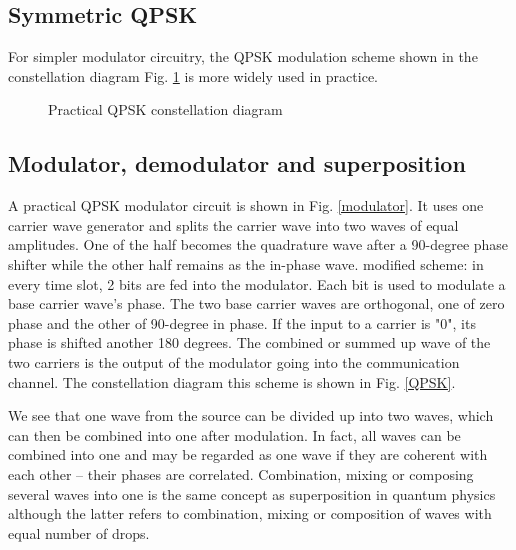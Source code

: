 \documentclass{book}
\begin{document}
\subsection{Symmetric QPSK}
For simpler modulator circuitry, the QPSK modulation scheme shown in the constellation diagram Fig. \ref{sQPSK} is more widely used in practice.
\begin{figure}[hb]
\caption{Practical QPSK constellation diagram}
\label{sQPSK}
\end{figure}

\subsection{Modulator, demodulator and superposition}
A practical QPSK modulator circuit is shown in Fig. \ref{modulator}. It uses one carrier wave generator and splits the carrier wave into two waves of equal amplitudes. One of the half becomes the quadrature wave after a 90-degree phase shifter while the other half remains as the in-phase wave. modified scheme: in every time slot, 2 bits are fed into the modulator. Each bit is used to modulate a base carrier wave's phase. The two base carrier waves are orthogonal, one of zero phase and the other of 90-degree in phase. If the input to a carrier is "0", its phase is shifted another 180 degrees. The combined or summed up wave of the two carriers is the output of the modulator going into the communication channel. The constellation diagram this scheme is shown in Fig. \ref{QPSK}.

We see that one wave from the source can be divided up into two waves, which can then be combined into one after modulation. In fact, all waves can be combined into one and may be regarded as one wave if they are coherent with each other -- their phases are correlated. Combination, mixing or composing several waves into one is the same concept as superposition in quantum physics although the latter refers to combination, mixing or composition of waves with equal number of drops.
\end{document}
